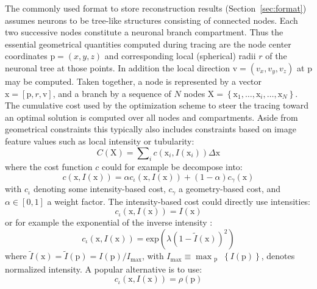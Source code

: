 The commonly used format to store reconstruction results (Section~\ref{sec:format}) assumes neurons to be tree-like structures consisting of connected nodes. Each two successive nodes constitute a neuronal branch compartment. Thus the essential geometrical quantities computed during tracing are the node center coordinates $\mathrm{p} = (x, y, z)$ and corresponding local (spherical) radii $r$ of the neuronal tree at those points. In addition the local direction $\mathrm{v} = ( v_x, v_y, v_z )$ at $\mathrm{p}$ may be computed. Taken together, a node is represented by a vector $\mathrm{x} = \left[  \mathrm{p}, r, \mathrm{v}\right]$, and a branch by a sequence of $N$ nodes $\mathrm{X} = \left\lbrace \mathrm{x}_1, \dots , \mathrm{x}_i, \dots, \mathrm{x}_N \right\rbrace$. The cumulative cost used by the optimization scheme to steer the tracing toward an optimal solution is computed over all nodes and compartments. Aside from geometrical constraints this typically also includes constraints based on image feature values such as local intensity or tubularity:
\begin{equation}
C(\mathrm{X}) = \sum\nolimits_{i} c(\mathrm{x}_i, I(\mathrm{x}_i)) \Delta\mathrm{x} 
\label{ch1_eq3}
\end{equation}
where the cost function $c$ could for example be decompose into:
\begin{equation}
c(\mathrm{x}, I(\mathrm{x})) = \alpha c_{\iota}(\mathrm{x}, I(\mathrm{x})) + (1-\alpha) c_{\gamma}(\mathrm{x}) 
\label{ch1_eq4}
\end{equation}
with $c_{\iota}$ denoting some intensity-based cost, $c_{\gamma}$ a geometry-based cost, and $ \alpha \in \left[ 0, 1 \right] $ a weight factor. The intensity-based cost could directly use intensities:
\begin{equation}
c_{\iota}( \mathrm{x}, I(\mathrm{x}) ) = I(\mathrm{x})
\end{equation}
or for example the exponential of the inverse intensity \cite{peng2010automatic}:
\begin{equation}
c_{\iota}( \mathrm{x}, I(\mathrm{x}) ) = \text{exp} \left(  \lambda  (1 - \tilde{I}(\mathrm{x}))^2 \right)
\end{equation}
where $ \tilde{I}(\mathrm{x}) = \tilde{I}(\mathrm{p}) = I(\mathrm{p}) / I_{\max}$, with $I_{\max} \equiv \max_{\substack{\mathrm{p}}} \left\lbrace  I(\mathrm{p}) \right\rbrace $, denotes normalized intensity. A popular alternative is to use:
\begin{equation}
c_{\iota}( \mathrm{x}, I(\mathrm{x}) ) = \rho(\mathrm{p})
\end{equation}
